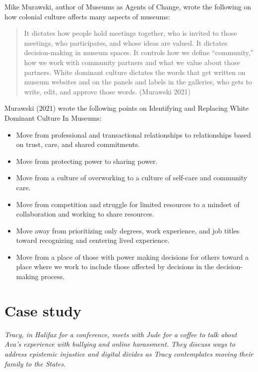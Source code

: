 \documentclass[
  letterpaper,
  DIV=11,
  numbers=noendperiod]{scrreprt}
\begin{document}
Mike Murawski, author of Museums as Agents of Change, wrote the
following on how colonial culture affects many aspects of museums:

\begin{quote}
It dictates how people hold meetings together, who is invited to those
meetings, who participates, and whose ideas are valued. It dictates
decision-making in museum spaces. It controls how we define
``community,'' how we work with community partners and what we value
about those partners. White dominant culture dictates the words that get
written on museum websites and on the panels and labels in the
galleries, who gets to write, edit, and approve those words. (Murawski
2021)
\end{quote}

Murawski (2021) wrote the following points on Identifying and Replacing
White Dominant Culture In Museums:

\begin{itemize}
\item
  Move from professional and transactional relationships to
  relationships based on trust, care, and shared commitments.
\item
  Move from protecting power to sharing power.
\item
  Move from a culture of overworking to a culture of self-care and
  community care.
\item
  Move from competition and struggle for limited resources to a mindset
  of collaboration and working to share resources.
\item
  Move away from prioritizing only degrees, work experience, and job
  titles toward recognizing and centering lived experience.
\item
  Move from a place of those with power making decisions for others
  toward a place where we work to include those affected by decisions in
  the decision-making process.
\end{itemize}

\section{Case study}\label{case-study-8}

\emph{Tracy, in Halifax for a conference, meets with Jude for a coffee
to talk about Ava's experience with bullying and online harassment. They
discuss ways to address epistemic injustice and digital divides as Tracy
contemplates moving their family to the States.}
\end{document}
